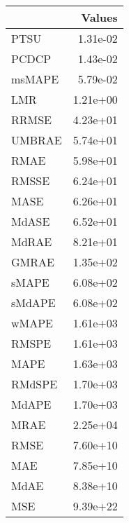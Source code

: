 \begin{tabular}{lr}
\toprule
 & Values \\
\midrule
PTSU & 1.31e-02 \\
PCDCP & 1.43e-02 \\
msMAPE & 5.79e-02 \\
LMR & 1.21e+00 \\
RRMSE & 4.23e+01 \\
UMBRAE & 5.74e+01 \\
RMAE & 5.98e+01 \\
RMSSE & 6.24e+01 \\
MASE & 6.26e+01 \\
MdASE & 6.52e+01 \\
MdRAE & 8.21e+01 \\
GMRAE & 1.35e+02 \\
sMAPE & 6.08e+02 \\
sMdAPE & 6.08e+02 \\
wMAPE & 1.61e+03 \\
RMSPE & 1.61e+03 \\
MAPE & 1.63e+03 \\
RMdSPE & 1.70e+03 \\
MdAPE & 1.70e+03 \\
MRAE & 2.25e+04 \\
RMSE & 7.60e+10 \\
MAE & 7.85e+10 \\
MdAE & 8.38e+10 \\
MSE & 9.39e+22 \\
\bottomrule
\end{tabular}
